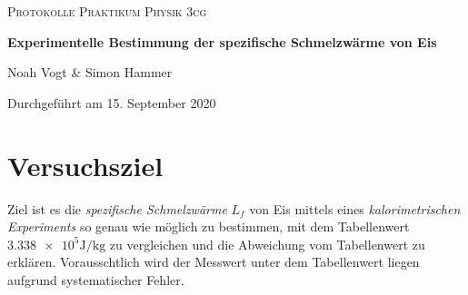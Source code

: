\documentclass[a4paper,12pt]{article}
\begin{document}
\begin{titlepage}

\vspace*{1cm}
	\centering
	
	{\scshape\Large Protokolle Praktikum Physik 3cg \par}
	\vspace{0.5cm}
	{\huge\bfseries Experimentelle Bestimmung der spezifische Schmelzwärme von Eis\par}
	\vspace{0.5cm}
	{\Large Noah Vogt \& Simon Hammer\par}
	\vspace{0.5cm}

	{\large Durchgeführt am 15. September 2020\par}
	
\end{titlepage}

\tableofcontents
\pagebreak

\section{Versuchsziel}
Ziel ist es die \textit{spezifische Schmelzwärme} $L_f$ von Eis mittels eines \textit{kalorimetrischen Experiments} so genau wie möglich zu bestimmen, mit dem Tabellenwert $ \num{3.338 e5}\si{\J\per\kg} $ zu vergleichen und die Abweichung vom Tabellenwert zu erklären. Vorausschtlich wird der Messwert unter dem Tabellenwert liegen aufgrund systematischer Fehler.
\end{document}

